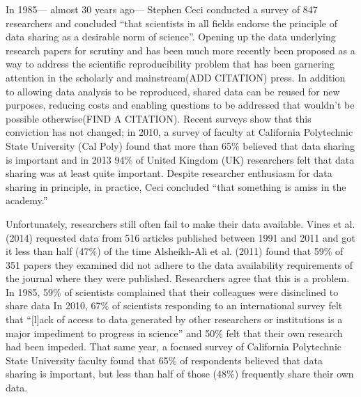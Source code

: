\documentclass[10pt]{article}
\begin{document}
In 1985--- almost 30 years ago--- Stephen Ceci conducted a survey of 847 researchers and concluded ``that scientists in all fields endorse the principle of data sharing as a desirable norm of science''\cite{ceci_scientists_1988}.
Opening up the data underlying research papers for scrutiny and has been much more recently been proposed\cite{drew_lost_2013, collins_policy_2014} as a way to address the scientific reproducibility problem that has been garnering attention in the scholarly\cite{ioannidis_why_2005, prinz_believe_2011, mobley_survey_2013} and mainstream(ADD CITATION) press.
In addition to allowing data analysis to be reproduced, shared data can be reused for new purposes, reducing costs\cite{piwowar_data_2011} and enabling questions to be addressed that wouldn't be possible otherwise(FIND A CITATION).
Recent surveys show that this conviction has not changed; in 2010, a survey of faculty at California Polytechnic State University (Cal Poly) found that more than 65\% believed that data sharing is important\cite{scaramozzino_study_2012} and in 2013 94\% of United Kingdom (UK) researchers felt that data sharing was at least quite important\cite{bobrow_establishing_2014}.
Despite researcher enthusiasm for data sharing in principle, in practice, Ceci concluded ``that something is amiss in the academy.''

Unfortunately, researchers still often fail to make their data available.
Vines et al. (2014) requested data from 516 articles published between 1991 and 2011 and got it less than half (47\%) of the time\cite{vines_availability_2014}
Alsheikh-Ali et al. (2011) found that 59\% of 351 papers they examined did not adhere to the data availability requirements of the journal where they were published.
Researchers agree that this is a problem.
In 1985, 59\% of scientists complained that their colleagues were disinclined to share data\cite{cedi_scientists_1988}
In 2010, 67\% of scientists responding to an international survey felt that ``[l]ack of access to data generated by other researchers or institutions is a major impediment to progress in science'' and 50\% felt that their own research had been impeded\cite{tenopir_data_2011}.
That same year, a focused survey of California Polytechnic State University faculty found that 65\% of respondents believed that data sharing is important, but less than half of those (48\%) frequently share their own data\cite{scaramozzino_study_2012}.
\end{document}
